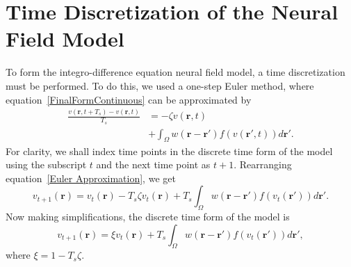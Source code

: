 \documentclass[review,authoryear,3p]{elsarticle}
\begin{document}
\section{Time Discretization of the Neural Field Model}
\label{App:Time Discretization} To form the integro-difference equation neural field model, a time discretization must be performed. To do this, we used a one-step Euler method, where equation~\ref{FinalFormContinuous} can be approximated by 
\begin{align}
	\label{Euler Approximation}\frac{v\left( \mathbf{r},t+T_s \right) - v\left( \mathbf{r},t\right)}{T_s} &=-\zeta v\left( \mathbf{r},t \right) \nonumber \\ 
&+ \int_\Omega {w\left( \mathbf{r}-\mathbf{r}' \right)f\left( {v\left( \mathbf{r}',t \right)} \right)d\mathbf{r}'}. 
\end{align}
For clarity, we shall index time points in the discrete time form of the model using the subscript $t$ and the next time point as $t+1$. Rearranging equation~\ref{Euler Approximation}, we get 
\begin{equation}
	\label{Euler Approximation2} v_{t+1}\left( \mathbf{r}\right) = v_t\left( \mathbf{r}\right) -T_s \zeta v_t\left( \mathbf{r}\right) + T_s \int_\Omega {w\left( \mathbf{r}-\mathbf{r}' \right)f\left( {v_t\left( \mathbf{r}'\right)} \right)d\mathbf{r}'}. 
\end{equation}
Now making simplifications, the discrete time form of the model is 
\begin{equation}
	\label{Discrete Time Model1}v_{t+1}\left(\mathbf{r}\right) = \xi v_t\left(\mathbf{r}\right) + T_s \int_\Omega { w\left(\mathbf{r}-\mathbf{r}'\right) f\left(v_t\left(\mathbf{r}'\right)\right) d\mathbf{r}'}, 
\end{equation}
where $\xi = 1 - T_s \zeta$.
\end{document}
